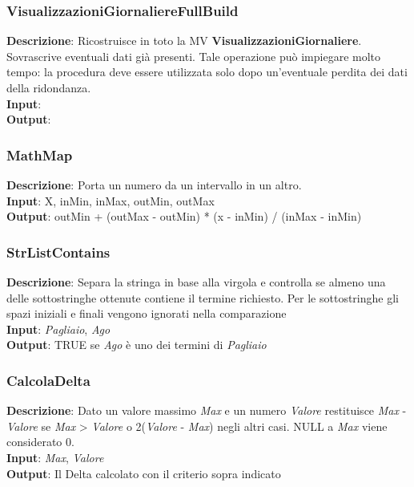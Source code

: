 \documentclass{article}
\begin{document}
\subsubsection{VisualizzazioniGiornaliereFullBuild}
\textbf{Descrizione}: Ricostruisce in toto la MV \textbf{VisualizzazioniGiornaliere}. Sovrascrive eventuali dati già presenti. Tale operazione può impiegare molto tempo: la procedura deve essere utilizzata solo dopo un'eventuale perdita dei dati della ridondanza. \\
\textbf{Input}: \\
\textbf{Output}: \\
\subsubsection{MathMap}
\textbf{Descrizione}: Porta un numero da un intervallo in un altro. \\
\textbf{Input}: X, inMin, inMax, outMin, outMax \\
\textbf{Output}: outMin + (outMax - outMin) * (x - inMin) / (inMax - inMin)\\
\subsubsection{StrListContains}
\textbf{Descrizione}: Separa la stringa in base alla virgola e controlla se almeno una delle sottostringhe ottenute contiene il termine richiesto. Per le sottostringhe gli spazi iniziali e finali vengono ignorati nella comparazione \\
\textbf{Input}: \textit{Pagliaio}, \textit{Ago} \\
\textbf{Output}: TRUE se \textit{Ago} è uno dei termini di \textit{Pagliaio}\\
\subsubsection{CalcolaDelta}
\textbf{Descrizione}: Dato un valore massimo \textit{Max} e un numero \textit{Valore} restituisce \textit{Max} - \textit{Valore} se \textit{Max} > \textit{Valore} \textit{}o 2(\textit{Valore} - \textit{Max}) negli altri casi. NULL a \textit{Max} viene considerato 0. \\
\textbf{Input}: \textit{Max}, \textit{Valore} \\
\textbf{Output}: Il Delta calcolato con il criterio sopra indicato \\
\end{document}

